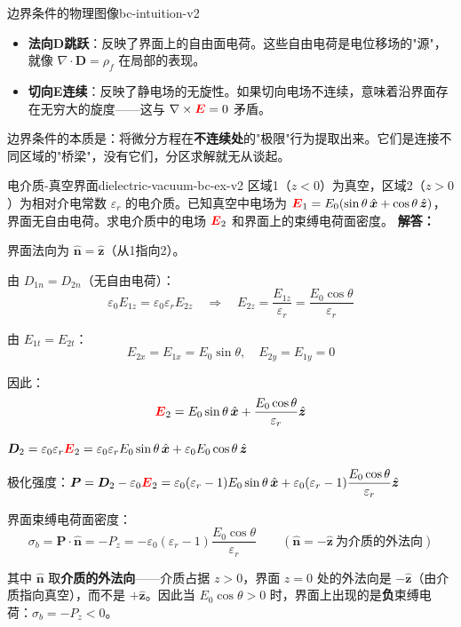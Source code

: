 \documentclass[11pt,a4paper,openany,oneside]{book}
\newcommand{\vecE}{\textcolor{red}{\vect{E}}}
\newcommand{\eps}{\varepsilon}
\newcommand{\vect}[1]{\bm{#1}}
\newcommand{\unitvec}[1]{\hat{\vect{#1}}}
\newcommand{\curl}{\nabla\times}
\newcommand{\divg}{\nabla\cdot}
\newcommand{\difficulty}[1]{\marginnote{\textcolor{red}{\textbf{[#1]}}}}
\begin{document}
\begin{insight}{边界条件的物理图像}{bc-intuition-v2}
\begin{itemize}
\item \textbf{法向D跳跃}：反映了界面上的自由面电荷。这些自由电荷是电位移场的"源"，就像 $\divg\vect{D} = \rho_f$ 在局部的表现。
\item \textbf{切向E连续}：反映了静电场的无旋性。如果切向电场不连续，意味着沿界面存在无穷大的旋度——这与 $\curl\vecE = 0$ 矛盾。
\end{itemize}

边界条件的本质是：将微分方程在\textbf{不连续处}的"极限"行为提取出来。它们是连接不同区域的"桥梁"，没有它们，分区求解就无从谈起。
\end{insight}

\begin{example}{电介质-真空界面}{dielectric-vacuum-bc-ex-v2}
\difficulty{提高}
区域1（$z<0$）为真空，区域2（$z>0$）为相对介电常数 $\eps_r$ 的电介质。已知真空中电场为 $\vecE_1 = E_0(\sin\theta\,\unitvec{x} + \cos\theta\,\unitvec{z})$，界面无自由电荷。求电介质中的电场 $\vecE_2$ 和界面上的束缚电荷面密度。
\tcblower
\textbf{解答：}

界面法向为 $\unitvec{n} = \unitvec{z}$（从1指向2）。

由 $D_{1n} = D_{2n}$（无自由电荷）：
\[
\eps_0 E_{1z} = \eps_0\eps_r E_{2z} \quad\Rightarrow\quad E_{2z} = \frac{E_{1z}}{\eps_r} = \frac{E_0\cos\theta}{\eps_r}
\]

由 $E_{1t} = E_{2t}$：
\[
E_{2x} = E_{1x} = E_0\sin\theta, \quad E_{2y} = E_{1y} = 0
\]

因此：
\[
\vecE_2 = E_0\sin\theta\,\unitvec{x} + \frac{E_0\cos\theta}{\eps_r}\unitvec{z}
\]

$\vect{D}_2 = \eps_0\eps_r\vecE_2 = \eps_0\eps_r E_0\sin\theta\,\unitvec{x} + \eps_0 E_0\cos\theta\,\unitvec{z}$

极化强度：$\vect{P} = \vect{D}_2 - \eps_0\vecE_2 = \eps_0(\eps_r-1)E_0\sin\theta\,\unitvec{x} + \eps_0(\eps_r-1)\dfrac{E_0\cos\theta}{\eps_r}\unitvec{z}$

界面束缚电荷面密度：
\[
\sigma_b = \vect{P}\cdot\unitvec{n} = -P_z = -\eps_0(\eps_r-1)\frac{E_0\cos\theta}{\eps_r} \qquad (\unitvec{n} = -\unitvec{z}\ \text{为介质的外法向})
\]

其中 $\unitvec{n}$ 取\textbf{介质的外法向}——介质占据 $z>0$，界面 $z=0$ 处的外法向是 $-\unitvec{z}$（由介质指向真空），而不是 $+\unitvec{z}$。因此当 $E_0\cos\theta>0$ 时，界面上出现的是\textbf{负}束缚电荷：$\sigma_b = -P_z < 0$。


\end{example}
\end{document}
